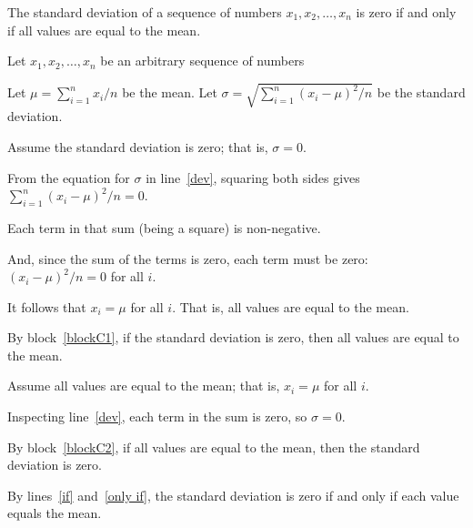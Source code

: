 \documentclass[11pt]{article}
\begin{document}
\begin{problems}

\problem

\begin{theorem}
  The standard deviation of a sequence of numbers $x_1, x_2,\ldots, x_n$
  is zero if and only if all values are equal to the mean.
\end{theorem}
\begin{longFormProof}
  \begin{block}[blockC]
    {Let $x_1,x_2,\ldots,x_n$ be an arbitrary sequence of numbers}
    
    \step[dev] 
    Let $\mu=\sum_{i=1}^n x_i/n$ be the mean. 
    Let $\sigma=\sqrt{\sum_{i=1}^n (x_i-\mu)^2/n}$ be the standard deviation.

    
    \begin{block}[blockC1]
      {Assume the standard deviation is zero; that is, $\sigma=0$.}
      
      \step From the equation for $\sigma$ in  line~\ref{dev},
      squaring both sides gives
      $\sum_{i=1}^n (x_i-\mu)^2/n = 0$.

      \step Each term in that sum (being a square) is non-negative.

      \step And, since the sum of the terms is zero, each term must be zero:
      $(x_i-\mu)^2/n = 0$ for all $i$.

      \step It follows that $x_i = \mu$ for all $i$.  That is, all values are equal to the mean.
    \end{block}
    
    \step[if] By block~\ref{blockC1},
    if the standard deviation is zero, then all values are equal to the mean.

    \begin{block}[blockC2]
      {Assume all values are equal to the mean; that is, $x_i = \mu$ for all $i$.}

      \step Inspecting line~\ref{dev}, each term in the sum is zero, so $\sigma=0$.
    \end{block}
    
    \step[only if] By block~\ref{blockC2},
    if all values are equal to the mean, then the standard deviation is zero.
    
    \step By lines~\ref{if} and~\ref{only if},
    the standard deviation is zero if and only if each value equals the mean.
  \end{block}
\end{longFormProof}


\end{problems}
\end{document}
